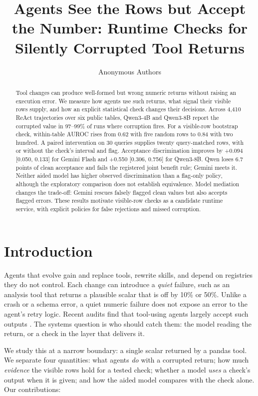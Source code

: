 \documentclass[letterpaper]{article}
\title{Agents See the Rows but Accept the Number: Runtime Checks for Silently Corrupted Tool Returns}
\author{Anonymous Authors}
\begin{document}
\maketitle
\begin{abstract}
Tool changes can produce well-formed but wrong numeric returns without raising an execution error. We measure how agents use such returns, what signal their visible rows supply, and how an explicit statistical check changes their decisions. Across 4,410 ReAct trajectories over six public tables, Qwen3-4B and Qwen3-8B report the corrupted value in 97--99\% of runs where corruption fires. For a visible-row bootstrap check, within-table AUROC rises from 0.62 with five random rows to 0.84 with two hundred. A paired intervention on 30 queries supplies twenty query-matched rows, with or without the check's interval and flag. Acceptance discrimination improves by +0.094 [0.050, 0.133] for Gemini Flash and +0.550 [0.306, 0.756] for Qwen3-8B. Qwen loses 6.7 points of clean acceptance and fails the registered joint benefit rule; Gemini meets it. Neither aided model has higher observed discrimination than a flag-only policy, although the exploratory comparison does not establish equivalence. Model mediation changes the trade-off: Gemini rescues falsely flagged clean values but also accepts flagged errors. These results motivate visible-row checks as a candidate runtime service, with explicit policies for false rejections and missed corruption.
\end{abstract}
\section{Introduction}

Agents that evolve gain and replace tools, rewrite skills, and depend on registries they do not control. Each change can introduce a \emph{quiet} failure, such as an analysis tool that returns a plausible scalar that is off by 10\% or 50\%. Unlike a crash or a schema error, a quiet numeric failure does not expose an error to the agent's retry logic. Recent audits find that tool-using agents largely accept such outputs \citep{TaoYin2026,Overreliance,LoudQuietFailures}. The systems question is who should catch them: the model reading the return, or a check in the layer that delivers it.


We study this at a narrow boundary: a single scalar returned by a pandas tool. We separate four quantities: what agents \emph{do} with a corrupted return; how much \emph{evidence} the visible rows hold for a tested check; whether a model \emph{uses} a check's output when it is given; and how the aided model compares with the check alone. Our contributions:
\end{document}
